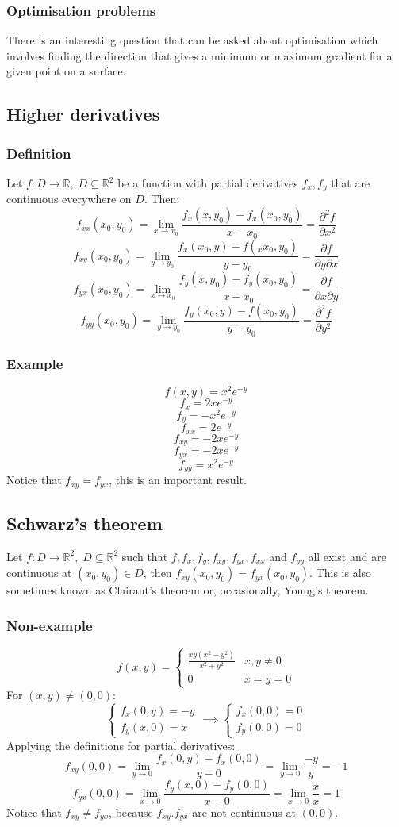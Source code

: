 \documentclass[12pt]{article}
\newcommand{\pf}[2]{\frac{\partial #1}{\partial #2}}
\begin{document}
\subsubsection*{Optimisation problems}
There is an interesting question that can be asked about optimisation which involves finding the direction that gives a minimum or maximum gradient for a given point on a surface. 
\subsection*{Higher derivatives}
\subsubsection*{Definition}
Let \(f:D\to\mathbb{R},\;D\subseteq\mathbb{R}^2\) be a function with partial derivatives \(f_x,f_y\) that are continuous everywhere on \(D\). Then:
\[f_{xx}(x_0,y_0)=\lim_{x\to x_0}\frac{f_x(x,y_0)-f_x(x_0,y_0)}{x-x_0}=\pf{^2f}{x^2}\]
\[f_{xy}(x_0,y_0)=\lim_{y\to y_0}\frac{f_x(x_0,y)-f(_xx_0,y_0)}{y-y_0}=\pf{f}{y\partial x}\]
\[f_{yx}(x_0,y_0)=\lim_{x\to x_0}\frac{f_y(x,y_0)-f_y(x_0,y_0)}{x-x_0}=\pf{f}{x\partial y}\]
\[f_{yy}(x_0,y_0)=\lim_{y\to y_0}\frac{f_y(x_0,y)-f(x_0,y_0)}{y-y_0}=\pf{^2f}{y^2}\]
\subsubsection*{Example}
\[f(x,y)=x^2e^{-y}\]
\[f_x=2xe^{-y}\]
\[f_y=-x^2e^{-y}\]
\[f_{xx}=2e^{-y}\]
\[f_{xy}=-2xe^{-y}\]
\[f_{yx}=-2xe^{-y}\]
\[f_{yy}=x^2e^{-y}\]
Notice that \(f_{xy}=f_{yx}\), this is an important result.
\subsection*{Schwarz's theorem}
Let \(f:D\to\mathbb{R}^2,\; D\subseteq\mathbb{R}^2\) such that \(f,f_x,f_y,f_{xy},f_{yx},f_{xx}\) and \(f_{yy}\) all exist and are continuous at \((x_0,y_0)\in D\), then \(f_{xy}(x_0,y_0)=f_{yx}(x_0,y_0)\). This is also sometimes known as Clairaut's theorem or, occasionally, Young's theorem.
\subsubsection*{Non-example}
\[f(x,y)=\begin{cases}
    \frac{xy(x^2-y^2)}{x^2+y^2} & x,y\ne 0 \\
    0 & x=y=0
\end{cases}\]
For \((x,y)\ne (0,0)\):
\[\begin{cases}
    f_x(0,y)=-y  \\
    f_y(x,0)=x
\end{cases}\implies \begin{cases}
    f_x(0,0)=0 \\
    f_y(0,0)=0
\end{cases}\]
Applying the definitions for partial derivatives:
\[f_{xy}(0,0)=\lim_{y\to 0}\frac{f_x(0,y)-f_x(0,0)}{y-0}=\lim_{y\to 0}\frac{-y}{y}=-1\]
\[f_{yx}(0,0)=\lim_{x\to 0}\frac{f_y(x,0)-f_y(0,0)}{x-0}=\lim_{x\to 0}\frac{x}{x}=1\]
Notice that \(f_{xy}\ne f_{yx}\), because \(f_{xy}.f_{yx}\) are not continuous at \((0,0)\).
\end{document}
